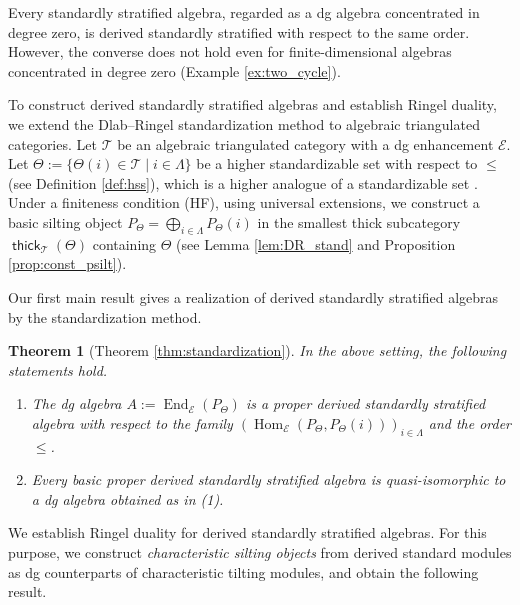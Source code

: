 \documentclass[a4paper,reqno,11pt]{amsart}
\numberwithin{equation}{section}
\newtheorem{theorem}{Theorem}[section]
\theoremstyle{definition}
\newcommand{\E}{\mathcal{E}}
\newcommand{\T}{\mathcal{T}}
\newcommand{\bte}{\Theta}
\DeclareMathOperator{\thick}{\mathsf{thick}}
\DeclareMathOperator{\End}{End}
\DeclareMathOperator{\Hom}{Hom}
\begin{document}
Every standardly stratified algebra, regarded as a dg algebra concentrated in degree zero, is derived standardly stratified with respect to the same order.
However, the converse does not hold even for finite-dimensional algebras concentrated in degree zero (Example \ref{ex:two_cycle}).

To construct derived standardly stratified algebras and establish Ringel duality, we extend the Dlab--Ringel standardization method to algebraic triangulated categories.
Let $\T$ be an algebraic triangulated category with a dg enhancement $\E$.
Let $\bte:=\{ \bte(i)\in \T \mid i\in\Lambda\}$ be a higher standardizable set with respect to $\leq$ (see Definition \ref{def:hss}), which is a higher analogue of a standardizable set \cite{DR92, ES03}.
Under a finiteness condition (HF), using universal extensions, we construct a basic silting object $P_{\bte}=\bigoplus_{i\in\Lambda} P_{\bte}(i)$ in the smallest thick subcategory $\thick_{\T}(\bte)$ containing $\bte$ (see Lemma \ref{lem:DR_stand} and Proposition \ref{prop:const_psilt}).

Our first main result gives a realization of derived standardly stratified algebras by the standardization method.

\begin{theorem}[Theorem \ref{thm:standardization}]
In the above setting, the following statements hold.
\begin{enumerate}
\item The dg algebra $A:=\End_{\E}(P_{\bte})$ is a proper derived standardly stratified algebra with respect to the family $(\Hom_{\E}(P_{\bte},P_{\bte}(i)))_{i\in\Lambda}$ and the order $\leq$.
\item Every basic proper derived standardly stratified algebra is quasi-isomorphic to a dg algebra obtained as in (1).
\end{enumerate}
\end{theorem}

We establish Ringel duality for derived standardly stratified algebras.
For this purpose, we construct \emph{characteristic silting objects} from derived standard modules as dg counterparts of characteristic tilting modules, and obtain the following result.
\end{document}
